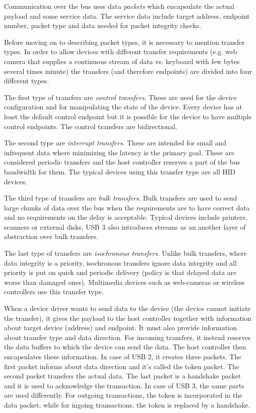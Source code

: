 Communication over the bus uses data \textit{packets} which encapsulate the
actual payload and some service data. The service data include target address,
endpoint number, packet type and data needed for packet integrity checks.

Before moving on to describing packet types, it is necessary to mention
transfer types. In order to allow devices with different transfer requirements
(e.g. web camera that supplies a continuous stream of data vs. keyboard with
few bytes several times minute) the transfers (and therefore endpoints) are
divided into four different types.

The first type of transfers are \textit{control transfers}. These are used for
the device configuration and for manipulating the state of the device. Every
device has at least the default control endpoint but it is possible for the
device to have multiple control endpoints. The control transfers are
bidirectional.

The second type are \textit{interrupt transfers}. These are intended for small
and infrequent data where minimizing the latency is the primary goal. These are
considered periodic transfers and the host controller reserves a part of the
bus bandwidth for them. The typical devices using this transfer type are all
HID devices.

The third type of transfers are \textit{bulk transfers}. Bulk transfers are
used to send large chunks of data over the bus when the requirements are to
have correct data and no requirements on the delay is acceptable. Typical
devices include printers, scanners or external disks. USB 3 also introduces
streams as an another layer of abstraction over bulk transfers.

The last type of transfers are \textit{isochronous transfers}. Unlike bulk
transfers, where data integrity is a priority, isochronous transfers ignore
data integrity and all priority is put on quick and periodic delivery (policy
is that delayed data are worse than damaged ones). Multimedia devices such as
web-cameras or wireless controllers use this transfer type.

When a device driver wants to send data to the device (the device cannot
initiate the transfer), it gives the payload to the host controller together
with information about target device (address) and endpoint. It must also
provide information about transfer type and data direction. For incoming
transfers, it instead reserves the data buffers to which the device can send
the data. The host controller then encapsulates these information. In case of
USB 2, it creates three packets. The first packet informs about data direction
and it's called the token packet. The second packet transfers the actual data.
The last packet is a handshake packet and it is used to acknowledge the
transaction. In case of USB 3, the same parts are used differently. For
outgoing transactions, the token is incorporated in the data packet; while for
ingoing transactions, the token is replaced by a handshake.

